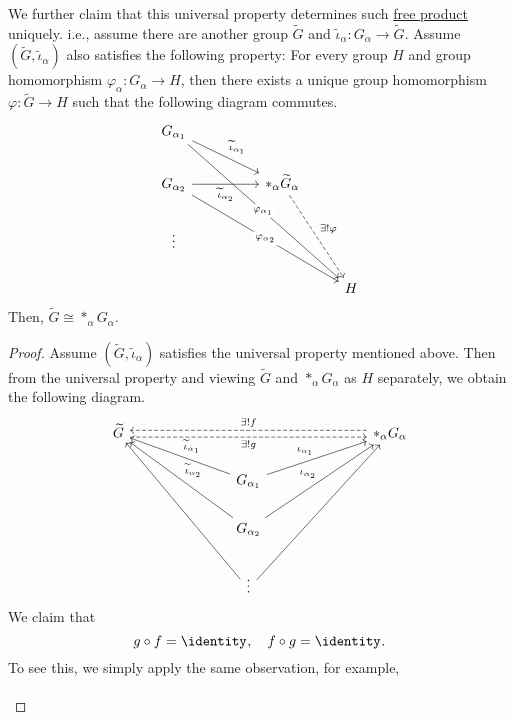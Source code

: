\begin{remark}
	We further claim that this universal property determines such \hyperref[def:free-product]{free product} uniquely. i.e., assume there are another group \(\widetilde{G} \) and
	\(\widetilde{\iota} _\alpha \colon G_\alpha \to \widetilde{G}\). Assume \((\widetilde{G} , \widetilde{\iota} _\alpha  )\) also satisfies the following property: For every
	group \(H\) and group homomorphism \(\varphi _\alpha \colon G_\alpha \to H\), then there exists a unique group homomorphism \(\varphi \colon \widetilde{G} \to H\) such that
	the following diagram commutes.
	\[
		\begin{tikzcd}
			{G_{\alpha_1}} \\
			{G_{\alpha_2}} && {\ast_\alpha \widetilde{G} _\alpha} \\
			\vdots \\
			&&& H
			\arrow["{\widetilde{\iota}_{\alpha_1}}", from=1-1, to=2-3]
			\arrow["{\widetilde{\iota}_{\alpha_2}}"', from=2-1, to=2-3]
			\arrow["{\exists ! \varphi}", dashed, from=2-3, to=4-4]
			\arrow["{\varphi_{\alpha_1}}"{description}, from=1-1, to=4-4]
			\arrow["{\varphi_{\alpha_2}}"{description}, from=2-1, to=4-4]
		\end{tikzcd}
	\]
	Then, \(\widetilde{G} \cong \ast_\alpha G_\alpha \).
	\begin{proof}
		Assume \((\widetilde{G} , \widetilde{\iota} _\alpha  )\) satisfies the universal property mentioned above. Then from the universal property and viewing \(\widetilde{G} \) and
		\(\ast_\alpha G_\alpha \) as \(H\) separately, we obtain the following diagram.
		\[
			\begin{tikzcd}
				{\widetilde{G}} &&&&&& {\ast_\alpha G_\alpha} \\
				&&& {G_{\alpha_1}} \\
				&&& {G_{\alpha_2}} \\
				&&& \vdots
				\arrow["{\iota_{\alpha_1}}", from=2-4, to=1-7]
				\arrow["{\iota_{\alpha_2}}", from=3-4, to=1-7]
				\arrow["{\exists ! f}"', shift right=1, dashed, from=1-7, to=1-1]
				\arrow["{\widetilde{\iota}_{\alpha_1}}"', from=2-4, to=1-1]
				\arrow["{\widetilde{\iota}_{\alpha_2}}"', from=3-4, to=1-1]
				\arrow[from=4-4, to=1-1]
				\arrow[from=4-4, to=1-7]
				\arrow["{\exists! g}"', shift right=1, dashed, from=1-1, to=1-7]
			\end{tikzcd}
		\]
		We claim that
		\[
			g\circ f = \identity_{},\quad f\circ g = \identity_{}.
		\]
		To see this, we simply apply the same observation, for example,
		\[
			\begin{tikzcd}

\end{tikzcd}\]
\end{proof}
\end{remark}
